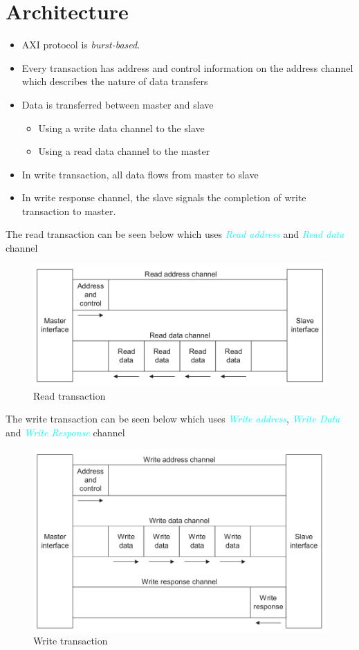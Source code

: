 \documentclass{article}
\newcommand{\chFormat}[1]{\emph{\textcolor{cyan}{#1}}}
\begin{document}
\section{Architecture}
\begin{itemize}
    \item AXI protocol is \emph{burst-based}.
    \item Every transaction has address and control information on the address channel which describes the nature of data transfers
    \item Data is transferred between master and slave
    \begin{itemize}
        \item Using a write data channel to the slave
        \item Using a read data channel to the master
    \end{itemize}
    \item In write transaction, all data flows from master to slave
    \item In write response channel, the slave signals the completion of write transaction to master.
\end{itemize}
\quad The read transaction can be seen below which uses \chFormat{Read address} and \chFormat{Read data} channel
\begin{figure}[H]
    \centering
    \includegraphics[width=1\textwidth]{Resources/ReadTransaction.png}
    \caption{Read transaction}
\end{figure}

\quad The write transaction can be seen below which uses \chFormat{Write address}, \chFormat{Write Data} and \chFormat{Write Response} channel
\begin{figure}[H]
    \centering
    \includegraphics[width=1\textwidth]{Resources/WriteTransaction.png}
    \caption{Write transaction}
\end{figure}
\end{document}
